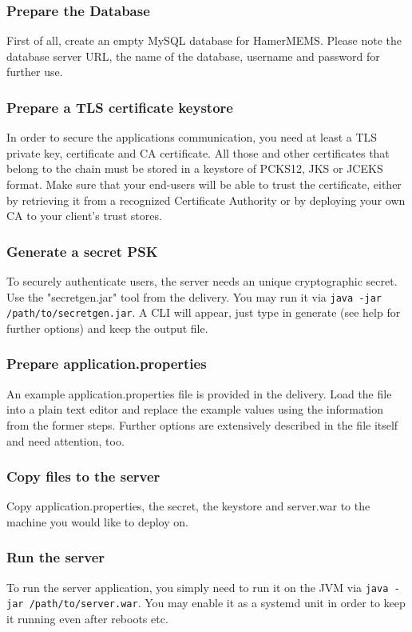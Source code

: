 \documentclass[twoside,a4paper]{refart}
\begin{document}
\subsubsection{Prepare the Database}
First of all, create an empty MySQL database for HamerMEMS. Please note the database server URL, the name of the database, username and password for further use.

\subsubsection{Prepare a TLS certificate keystore}
In order to secure the applications communication, you need at least a TLS private key, certificate and CA certificate. All those and other certificates that belong to the chain must be stored in a keystore of PCKS12, JKS or JCEKS format. Make sure that your end-users will be able to trust the certificate, either by retrieving it from a recognized Certificate Authority or by deploying your own CA to your client's trust stores.

\subsubsection{Generate a secret PSK}
To securely authenticate users, the server needs an unique cryptographic secret. Use the "secretgen.jar" tool from the delivery. You may run it via \texttt{java -jar /path/to/secretgen.jar}. A CLI will appear, just type in generate (see help for further options) and keep the output file.

\subsubsection{Prepare application.properties}
An example application.properties file is provided in the delivery. Load the file into a plain text editor and replace the example values using the information from the former steps. Further options are extensively described in the file itself and need attention, too.

\subsubsection{Copy files to the server}
Copy application.properties, the secret, the keystore and server.war to the machine you would like to deploy on.

\subsubsection{Run the server}
To run the server application, you simply need to run it on the JVM via \texttt{java -jar /path/to/server.war}. You may enable it as a systemd unit in order to keep it running even after reboots etc.
\end{document}
